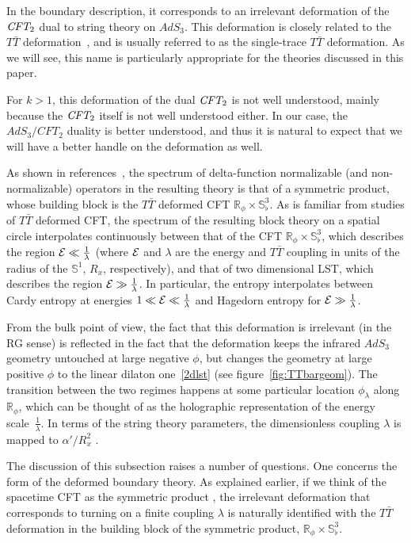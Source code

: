 \documentclass[12pt]{article}
\newcommand{\bR}{{\mathbb R}}
\newcommand{\bS}{{\mathbb S}}
\numberwithin{equation}{section}
\begin{document}
In the boundary description, it corresponds to an irrelevant deformation of the ${\it CFT_{\rm 2}}$ dual to string theory on $AdS_3$. This deformation is closely related to the $T\bar T$ deformation~, and is usually referred to as the single-trace $T\bar T$ deformation. As we will see, this name is particularly appropriate for the theories discussed in this paper.

For $k>1$, this deformation of the dual ${\it CFT_{\rm 2}}$ is not well understood, mainly because the ${\it CFT_{\rm 2}}$ itself is not well understood either. In our case, the $AdS_3/CFT_2$ duality is better understood, and thus it is natural to expect that we will have a better handle on the deformation as well. 

As shown in references~, the spectrum of delta-function normalizable (and non-normalizable) operators in the resulting theory is that of a symmetric product, whose building block is the $T\bar T$ deformed CFT $\bR_\phi\times \bS^3_\flat$. As is familiar from studies of $T\bar T$ deformed CFT, the spectrum of the resulting block theory on a spatial circle interpolates continuously between that of the CFT $\bR_\phi\times \bS^3_\flat$, which describes the region $\mathcal {E}\ll \frac1\lambda$ (where $\mathcal {E}$ and $\lambda$ are the energy and $T\bar T$ coupling in units of the radius of the $\bS^1$, $R_x$, respectively), and that of two dimensional LST, which describes the region $\mathcal {E}\gg \frac1\lambda$. In particular, the entropy interpolates between Cardy entropy at energies $1\ll \mathcal {E}\ll \frac1\lambda$ and Hagedorn entropy for $\mathcal {E}\gg \frac1\lambda$.

From the bulk point of view, the fact that this deformation is irrelevant (in the RG sense) is reflected in the fact that the deformation keeps the infrared $AdS_3$ geometry untouched at large negative $\phi$, but changes the geometry at large positive $\phi$ to the linear dilaton one~\eqref{2dlst} (see figure~\ref{fig:TTbargeom}). The transition between the two regimes happens at some particular location $\phi_\lambda$ along $\bR_\phi$, which can be thought of as the holographic representation of the energy scale~$\frac1\lambda$. In terms of the string theory parameters, the dimensionless coupling $\lambda$ is mapped to $\alpha'/R_x^2$  .

The discussion of this subsection raises a number of questions. One concerns the form of the deformed boundary theory. As explained earlier, if we think of the spacetime CFT as the symmetric product \ourcft, the irrelevant deformation that corresponds to turning on a finite coupling $\lambda$ is naturally identified with the $T\bar T$ deformation in the building block of the symmetric product, $\bR_\phi\times\bS^3_\flat$. 
\end{document}
